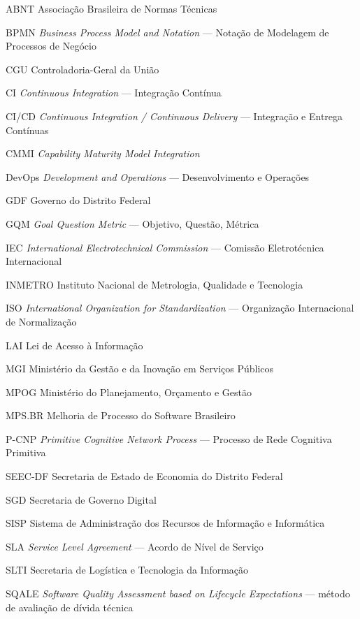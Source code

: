\begin{siglas}
  \item[ABNT]   Associação Brasileira de Normas Técnicas
  \item[BPMN]   \textit{Business Process Model and Notation} — Notação de Modelagem de Processos de Negócio
  \item[CGU]    Controladoria-Geral da União
  \item[CI]     \textit{Continuous Integration} — Integração Contínua
  \item[CI/CD]  \textit{Continuous Integration / Continuous Delivery} — Integração e Entrega Contínuas
  \item[CMMI]   \textit{Capability Maturity Model Integration}
  \item[DevOps] \textit{Development and Operations} — Desenvolvimento e Operações
  \item[GDF]    Governo do Distrito Federal
  \item[GQM]    \textit{Goal Question Metric} — Objetivo, Questão, Métrica
  \item[IEC]    \textit{International Electrotechnical Commission} — Comissão Eletrotécnica Internacional
  \item[INMETRO] Instituto Nacional de Metrologia, Qualidade e Tecnologia
  \item[ISO]    \textit{International Organization for Standardization} — Organização Internacional de Normalização
  \item[LAI]    Lei de Acesso à Informação
  \item[MGI]    Ministério da Gestão e da Inovação em Serviços Públicos
  \item[MPOG]   Ministério do Planejamento, Orçamento e Gestão
  \item[MPS.BR] Melhoria de Processo do Software Brasileiro
  \item[P-CNP]  \textit{Primitive Cognitive Network Process} — Processo de Rede Cognitiva Primitiva
  \item[SEEC-DF] Secretaria de Estado de Economia do Distrito Federal
  \item[SGD]    Secretaria de Governo Digital
  \item[SISP]   Sistema de Administração dos Recursos de Informação e Informática
  \item[SLA]    \textit{Service Level Agreement} — Acordo de Nível de Serviço
  \item[SLTI]   Secretaria de Logística e Tecnologia da Informação
  \item[SQALE]  \textit{Software Quality Assessment based on Lifecycle Expectations} — método de avaliação de dívida técnica

\end{siglas}
